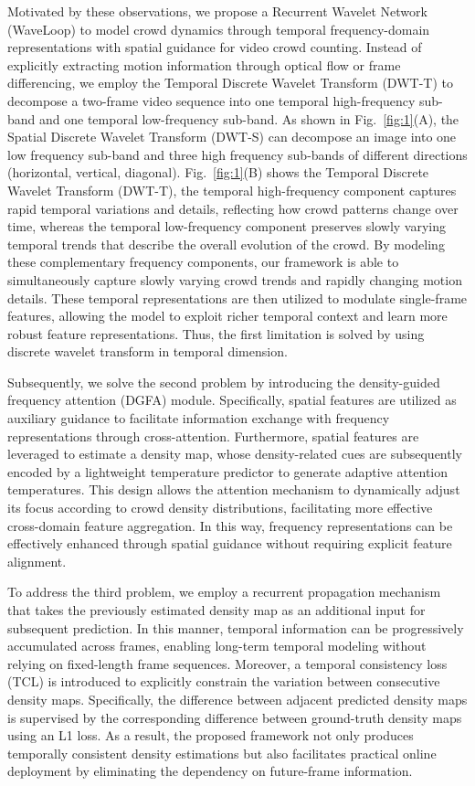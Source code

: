 \documentclass[lettersize,journal]{IEEEtran}
\begin{document}
Motivated by these observations, we propose a Recurrent Wavelet Network (WaveLoop) to model crowd dynamics through temporal frequency-domain representations with spatial guidance for video crowd counting. Instead of explicitly extracting motion information through optical flow or frame differencing, we employ the Temporal Discrete Wavelet Transform (DWT-T) to decompose a two-frame video sequence into one temporal high-frequency sub-band and one temporal low-frequency sub-band. As shown in Fig.~\ref{fig:1}(A), the Spatial Discrete Wavelet Transform (DWT-S) can decompose an image into one low frequency sub-band and three 
high frequency sub-bands of different directions (horizontal, vertical, diagonal). Fig.~\ref{fig:1}(B) shows the Temporal Discrete Wavelet Transform (DWT-T), the temporal high-frequency component captures rapid temporal variations and details, reflecting how crowd patterns change over time, whereas the temporal low-frequency component preserves slowly varying temporal trends that describe the overall evolution of the crowd. By modeling these complementary frequency components, our framework is able to simultaneously capture slowly varying crowd trends and rapidly changing motion details. These temporal representations are then utilized to modulate single-frame features, allowing the model to exploit richer temporal context and learn more robust feature representations. Thus, the first limitation is solved by using discrete wavelet transform in temporal dimension.

Subsequently, we solve the second problem by introducing the density-guided frequency attention (DGFA) module. Specifically, spatial features are utilized as auxiliary guidance to facilitate information exchange with frequency representations through cross-attention. Furthermore, spatial features are leveraged to estimate a density map, whose density-related cues are subsequently encoded by a lightweight temperature predictor to generate adaptive attention temperatures. This design allows the attention mechanism to dynamically adjust its focus according to crowd density distributions, facilitating more effective cross-domain feature aggregation. In this way, frequency representations can be effectively enhanced through spatial guidance without requiring explicit feature alignment.

To address the third problem, we employ a recurrent propagation mechanism that takes the previously estimated density map as an additional input for subsequent prediction. In this manner, temporal information can be progressively accumulated across frames, enabling long-term temporal modeling without relying on fixed-length frame sequences. Moreover, a temporal consistency loss (TCL) is introduced to explicitly constrain the variation between consecutive density maps. Specifically, the difference between adjacent predicted density maps is supervised by the corresponding difference between ground-truth density maps using an L1 loss. As a result, the proposed framework not only produces temporally consistent density estimations but also facilitates practical online deployment by eliminating the dependency on future-frame information.
\end{document}
